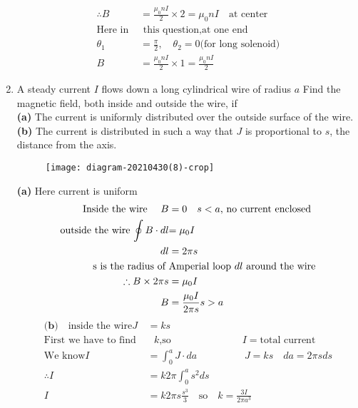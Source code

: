 \begin{enumerate}[ label=\color{ocre}\textbf{\arabic*.}]
\begin{answer}
\begin{align*}
		\therefore B&=\frac{\mu_0 nI}{2}\times2=\mu_0 nI \quad\text{at center}\\
		\text{Here in }&\text{ this question,at one end}\\
		\theta_1&=\frac{\pi}{2},\quad\theta_2=0 \text{(for long solenoid)}\\
		B&=\frac{\mu_0 n I}{2}\times1=\frac{\mu_0 n I}{2}
		\end{align*}
	\end{answer}
	\item A steady current $I$ flows down a long cylindrical wire of radius $a$ Find the magnetic field, both inside and outside the wire, if\\
	\textbf{(a)} The current is uniformly distributed over the outside surface of the wire.\\
	\textbf{(b)} The current is distributed in such a way that $J$ is proportional to $s$, the distance from the axis.
	\begin{figure}[H]
		\begin{center}
			\texttt{[image: diagram-20210430(8)-crop]}
		\end{center}
	\end{figure}
	\begin{answer}
		\textbf{(a)} Here current is uniform
		\begin{align*}
		\text{Inside the wire \quad $B$}&=\text{$0$\quad $s<a$, no current enclosed} \\
		\text{outside the wire $\oint B\cdot dl$}&\text{$=\mu_0I$}\\
		dl&=2\pi s\\
		\text{s is the radius of }&\text{Amperial loop $dl$ around the wire}\\
		\therefore B\times2\pi s&=\mu_0I\\
		B&=\frac{\mu_0I}{2\pi s}s>a\\
		\end{align*}
		\begin{align*}
		\textbf{(b)}\quad\text{inside the wire}J&=ks\\
		\text{First  we have to find }&\text{  $k$,so}\hspace{3cm}I=\text{total current}\\
		\text{We know}I&=\int_{0}^{a}J\cdot da \hspace{2cm}J=ks \quad da=2\pi s ds\\
		\therefore I&=k2\pi\int_{0}^{a}s^2ds\\
		I&=k2\pi s\frac{s^3}{3}\quad\text{so}\quad k=\frac{3I}{2\pi a^3}\\

\end{align*}
\end{answer}
\end{enumerate}
